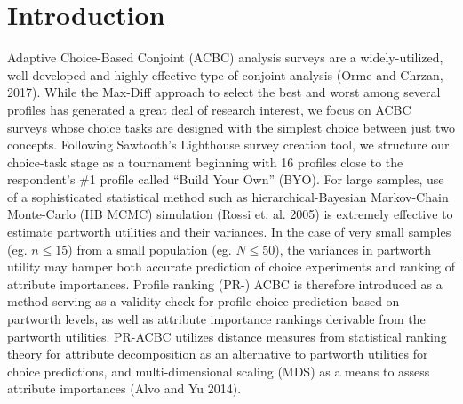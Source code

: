\documentclass[a4paper, 12pt]{article}
\begin{document}


 \vspace{1in}

\section{Introduction}

Adaptive Choice-Based Conjoint (ACBC) analysis surveys are a widely-utilized, well-developed and highly effective  type of conjoint analysis (Orme and Chrzan, 2017). While the Max-Diff approach to select the best and worst among several profiles has generated a great deal of research interest, we focus on ACBC surveys whose choice tasks are designed with the  simplest choice between just two concepts. Following Sawtooth's Lighthouse survey creation tool, we structure our choice-task stage as a tournament beginning with 16 profiles close to the respondent's \#1 profile called  ``Build Your Own'' (BYO). For large samples, use of a sophisticated statistical method such as hierarchical-Bayesian Markov-Chain Monte-Carlo (HB MCMC) simulation (Rossi et. al. 2005) is extremely effective to estimate partworth utilities and their variances. In the case of very small samples (eg. $n\le 15$) from a small population (eg. $N\le 50$), the variances in partworth utility may hamper both accurate prediction of choice experiments  and ranking of attribute importances.  Profile ranking (PR-) ACBC is therefore introduced as a method serving as a validity check for profile choice prediction based on partworth levels, as well as attribute importance rankings derivable from the partworth utilities.  PR-ACBC utilizes distance measures from statistical ranking theory for attribute decomposition as an alternative to partworth utilities for choice predictions, and  multi-dimensional scaling (MDS) as a means to assess attribute importances (Alvo and Yu 2014).
\end{document}
